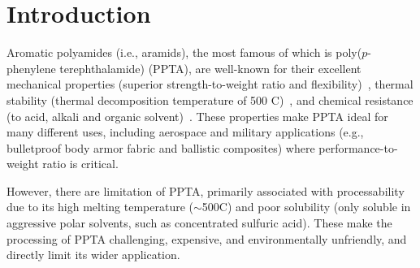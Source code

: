 \documentclass[journal=langd5,manuscript=article]{achemso}
\begin{document}
\section{Introduction}
Aromatic polyamides (i.e., aramids), the most famous of which is poly($p$-phenylene terephthalamide) (PPTA), are well-known for their excellent mechanical properties (superior strength-to-weight ratio and flexibility)~\cite{shim2001dynamic,knijnenberg2010synthesis}, thermal stability (thermal decomposition temperature of 500\textdegree{} C)~\cite{yang1993kevlar,mark1962aromatic}, and chemical resistance (to acid, alkali and organic solvent)~\cite{sockalingam2017recent,kim2008modified,krishnan2010numerical,rao2001structure,hogg2006composites}. 
These properties make PPTA ideal for many different uses, including aerospace and military applications (e.g., bulletproof body armor fabric and ballistic composites) where performance-to-weight ratio is critical. \cite{brauckmann2016structural,deshmukh2016conformational,chen2016advanced,dobb1979microvoids}

However, there are limitation of PPTA, primarily associated with processability due to its high melting temperature ($\sim$500\textdegree{}C) and poor solubility (only soluble in aggressive polar solvents, such as concentrated sulfuric acid).
These make the processing of PPTA challenging, expensive, and environmentally unfriendly, and directly limit its wider application.~\cite{debeaupte1992situ,ferreiro2005polyisophthalamides,ferrero2002synthesis,zhou2017synthesis,garcia2010high,huang2013solvent}
\end{document}
